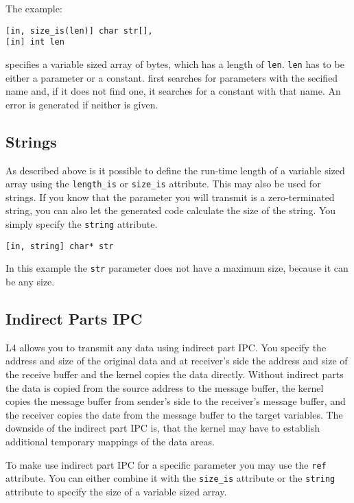 The example:
\begin{verbatim}
[in, size_is(len)] char str[], 
[in] int len
\end{verbatim}
specifies a variable sized array of bytes, which has a length
of \verb|len|. \verb|len| has to be either a parameter or
a constant. \dice{} first searches for parameters with the
secified name and, if it does not find one, it searches for
a constant with that name. An error is generated if neither 
is given.


\subsection{Strings}
As described above is it possible to define the run-time length
of a variable sized array using the \verb|length_is| or 
\verb|size_is| attribute. This may also be used for strings.
If you know that the parameter you will transmit is a zero-terminated string,
you can also let the generated code calculate the size of
the string. You simply specify the \verb|string| attribute.

\begin{verbatim}
[in, string] char* str
\end{verbatim}

In this example the \verb|str| parameter does not have a maximum
size, because it can be any size. 

\subsection{Indirect Parts IPC}
L4 allows you to transmit any data using 
indirect part IPC. You specify the address and size 
of the original data and at receiver's side the address and 
size of the receive buffer and the kernel copies the data
directly. Without indirect parts the data is copied from the
source address to the message buffer, the kernel copies the message buffer
from sender's side to the receiver's message buffer,
and the receiver copies the date from the message buffer to the target variables.
The downside of the indirect part IPC is, that the
kernel may have to establish additional temporary mappings 
of the data areas.

To make \dice{} use indirect part IPC for a specific parameter
you may use the \verb|ref| attribute. You can either combine it
with the \verb|size_is| attribute or the \verb|string| attribute
to specify the size of a variable sized array.

